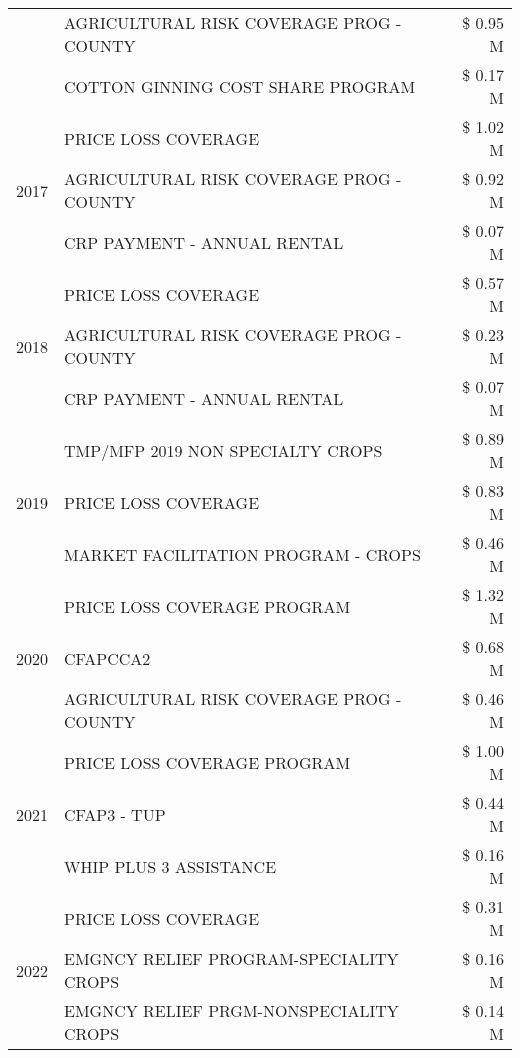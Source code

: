 \begin{tabular}{llr}
 & AGRICULTURAL RISK COVERAGE PROG - COUNTY & \$ 0.95 M \\
 & COTTON GINNING COST SHARE PROGRAM & \$ 0.17 M \\
\cline{1-3}
\multirow[t]{3}{*}{2017} & PRICE LOSS COVERAGE & \$ 1.02 M \\
 & AGRICULTURAL RISK COVERAGE PROG - COUNTY & \$ 0.92 M \\
 & CRP PAYMENT - ANNUAL RENTAL & \$ 0.07 M \\
\cline{1-3}
\multirow[t]{3}{*}{2018} & PRICE LOSS COVERAGE & \$ 0.57 M \\
 & AGRICULTURAL RISK COVERAGE PROG - COUNTY & \$ 0.23 M \\
 & CRP PAYMENT - ANNUAL RENTAL & \$ 0.07 M \\
\cline{1-3}
\multirow[t]{3}{*}{2019} & TMP/MFP 2019 NON SPECIALTY CROPS & \$ 0.89 M \\
 & PRICE LOSS COVERAGE & \$ 0.83 M \\
 & MARKET FACILITATION PROGRAM - CROPS & \$ 0.46 M \\
\cline{1-3}
\multirow[t]{3}{*}{2020} & PRICE LOSS COVERAGE PROGRAM & \$ 1.32 M \\
 & CFAPCCA2 & \$ 0.68 M \\
 & AGRICULTURAL RISK COVERAGE PROG - COUNTY & \$ 0.46 M \\
\cline{1-3}
\multirow[t]{3}{*}{2021} & PRICE LOSS COVERAGE PROGRAM & \$ 1.00 M \\
 & CFAP3 - TUP & \$ 0.44 M \\
 & WHIP PLUS 3 ASSISTANCE & \$ 0.16 M \\
\cline{1-3}
\multirow[t]{3}{*}{2022} & PRICE LOSS COVERAGE & \$ 0.31 M \\
 & EMGNCY RELIEF PROGRAM-SPECIALITY CROPS & \$ 0.16 M \\
 & EMGNCY RELIEF PRGM-NONSPECIALITY CROPS & \$ 0.14 M \\
\cline{1-3}
\bottomrule
\end{tabular}
